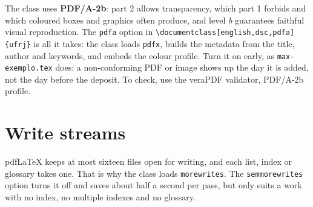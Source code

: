 \documentclass[english,dsc]{ufrj}
\begin{document}
  The class uses \textbf{PDF/A-2b}: part 2 allows transparency, which part 1
  forbids and which coloured boxes and graphics often produce, and level
  \emph{b} guarantees faithful visual reproduction. The \texttt{pdfa} option in
  \verb|\documentclass[english,dsc,pdfa]{ufrj}| is all it takes: the class
  loads \texttt{pdfx}, builds the metadata from the title, author and keywords,
  and embeds the colour profile. Turn it on early, as \texttt{max-exemplo.tex}
  does: a non-conforming PDF or image shows up the day it is added, not the day
  before the deposit. To check, use the veraPDF validator, PDF/A-2b profile.

  \section{Write streams}
  pdf\LaTeX{} keeps at most sixteen files open for writing, and each list,
  index or glossary takes one. That is why the class loads
  \texttt{morewrites}. The \texttt{semmorewrites} option turns it off and saves
  about half a second per pass, but only suits a work with no index, no
  multiple indexes and no glossary.
\end{document}
